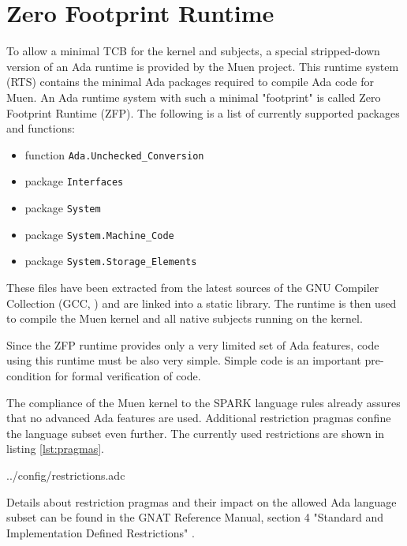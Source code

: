 \section{Zero Footprint Runtime}\label{sec:zfp-rts}
To allow a minimal TCB for the kernel and subjects, a special stripped-down
version of an Ada runtime is provided by the Muen project. This
runtime system (RTS) contains the minimal Ada packages required
to compile Ada code for Muen. An Ada runtime system with such a minimal
"footprint" is called Zero Footprint Runtime (ZFP). The following is
a list of currently supported packages and functions:

\begin{itemize}
	\item function \texttt{Ada.Unchecked\_Conversion}
	\item package \texttt{Interfaces}
	\item package \texttt{System}
	\item package \texttt{System.Machine\_Code}
	\item package \texttt{System.Storage\_Elements}
\end{itemize}

These files have been extracted from the latest sources of the GNU Compiler
Collection (GCC, \cite{gcc}) and are linked into a static library.
The runtime is then used to compile the Muen kernel and all native subjects
running on the kernel.

Since the ZFP runtime provides only a very limited set of Ada features, code
using this runtime must be also very simple. Simple code is an important
pre-condition for formal verification of code.

The compliance of the Muen kernel to the SPARK language rules
already assures that no advanced Ada features are used. Additional restriction
pragmas confine the language subset even further. The currently
used restrictions are shown in listing \ref{lst:pragmas}.


	{../config/restrictions.adc}

Details about restriction pragmas and their impact on the allowed Ada language
subset can be found in the GNAT Reference Manual, section 4 "Standard and
Implementation Defined Restrictions" \cite{GNAT:manual}.
